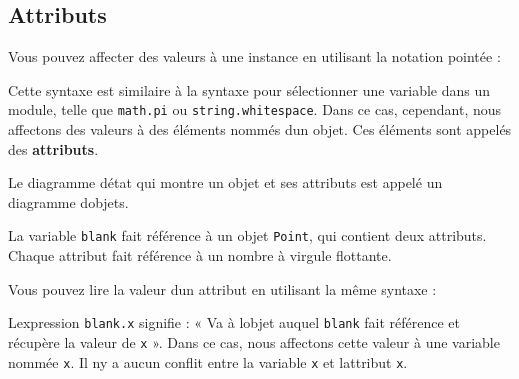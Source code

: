 \hypertarget{attributs}{%
\subsection{Attributs}\label{attributs}}

Vous pouvez affecter des valeurs à une instance en utilisant la notation
pointée :

\begin{Shaded}
\begin{Highlighting}[]
\OperatorTok{\textgreater{}\textgreater{}\textgreater{}}\OperatorTok{=} 
\OperatorTok{\textgreater{}\textgreater{}\textgreater{}}\OperatorTok{=} 
\end{Highlighting}
\end{Shaded}

Cette syntaxe est similaire à la syntaxe pour sélectionner une variable
dans un module, telle que \texttt{math.pi} ou
\texttt{string.whitespace}. Dans ce cas, cependant, nous affectons des
valeurs à des éléments nommés d\textquotesingle un objet. Ces éléments
sont appelés des \textbf{attributs}.

Le diagramme d\textquotesingle état qui montre un objet et ses attributs
est appelé un diagramme d\textquotesingle objets.

La variable \texttt{blank} fait référence à un objet \texttt{Point}, qui
contient deux attributs. Chaque attribut fait référence à un nombre à
virgule flottante.

Vous pouvez lire la valeur d\textquotesingle un attribut en utilisant la
même syntaxe :

\begin{Shaded}
\begin{Highlighting}[]
\OperatorTok{\textgreater{}\textgreater{}\textgreater{}} 
\OperatorTok{\textgreater{}\textgreater{}\textgreater{}}\OperatorTok{=}
\OperatorTok{\textgreater{}\textgreater{}\textgreater{}} 
\end{Highlighting}
\end{Shaded}

L\textquotesingle expression \texttt{blank.x} signifie : « Va à
l\textquotesingle objet auquel \texttt{blank} fait référence et récupère
la valeur de \texttt{x} ». Dans ce cas, nous affectons cette valeur à
une variable nommée \texttt{x}. Il n\textquotesingle y a aucun conflit
entre la variable \texttt{x} et l\textquotesingle attribut \texttt{x}.


